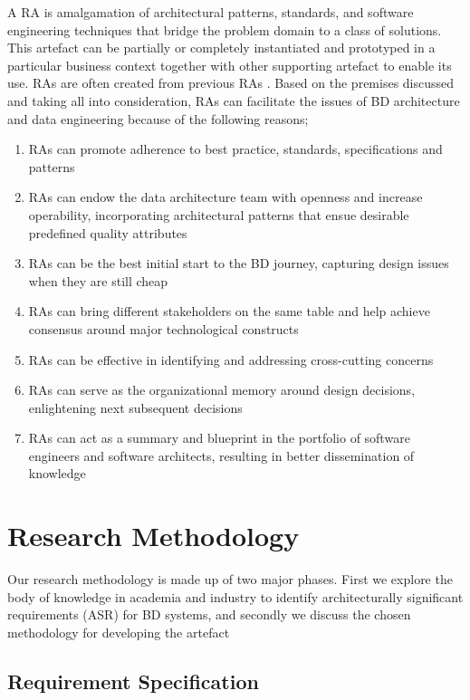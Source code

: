 \documentclass[review]{elsarticle}
\begin{document}
A RA is amalgamation of architectural patterns, standards, and software engineering techniques that bridge the problem domain to a class of solutions. This artefact can be partially or completely instantiated and prototyped in a particular business context together with other supporting artefact to enable its use. RAs are often created from previous RAs \cite{AtaeiACIS}. Based on the premises discussed and taking all into consideration, RAs can facilitate the issues of BD architecture and data engineering because of the following reasons;

\begin{enumerate}
    \item RAs can promote adherence to best practice, standards, specifications and patterns
    \item RAs can endow the data architecture team with openness and increase operability, incorporating architectural patterns that ensue desirable predefined quality attributes
    \item RAs can be the best initial start to the BD journey, capturing design issues when they are still cheap
    \item RAs can bring different stakeholders on the same table and help achieve consensus around major technological constructs
    \item RAs can be effective in identifying and addressing cross-cutting concerns
    \item RAs can serve as the organizational memory around design decisions, enlightening next subsequent decisions
    \item RAs can act as a summary and blueprint in the portfolio of software engineers and software architects, resulting in better dissemination of knowledge
\end{enumerate}

\section{Research Methodology} \label{RM-section}

Our research methodology is made up of two major phases. First we explore the body of knowledge in academia and industry to identify architecturally significant requirements (ASR) for BD systems, and secondly we discuss the chosen methodology for developing the artefact


\subsection{Requirement Specification} \label{requirement-spec-methodology}
\end{document}
